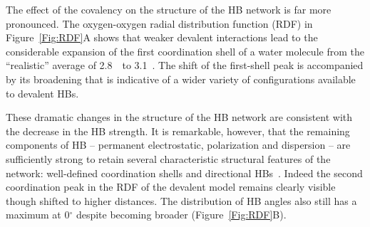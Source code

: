 \documentclass[aps,prl,reprint,amsmath,amssymb]{revtex4-1}
\begin{document}

The effect of the covalency on the structure of the HB network is far more pronounced. 
The oxygen-oxygen radial distribution function (RDF) in Figure~\ref{Fig:RDF}A shows that weaker devalent interactions lead to the considerable expansion of the first coordination shell of a water molecule from the ``realistic'' average of 2.8~\Ang\ to 3.1~\Ang. 
The shift of the first-shell peak is accompanied by its broadening that is indicative of a wider variety of configurations available to devalent HBs.

These dramatic changes in the structure of the HB network are consistent with the decrease in the HB strength. 
It is remarkable, however, that the remaining components of HB -- permanent electrostatic, polarization and dispersion -- are sufficiently strong to retain several characteristic structural features of the network: well-defined coordination shells and directional HBs~\cite{arunan2011definition}.
%
%
Indeed the second coordination peak in the RDF of the devalent model remains clearly visible though shifted to higher distances. 
The distribution of HB angles also still has a maximum at 0$^\circ$ despite becoming broader (Figure~\ref{Fig:RDF}B).
\end{document}
